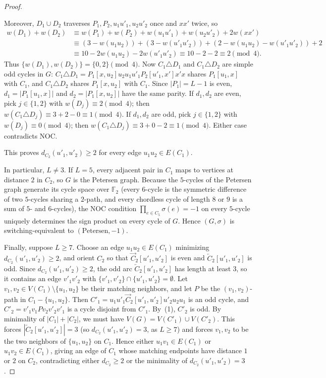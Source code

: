 \documentclass[10pt,letterpaper]{article}
\theoremstyle{zetaplain}
\theoremstyle{zetadef}
\theoremstyle{remark}
\numberwithin{equation}{section}
\newcommand{\vecC}[1]{\overrightarrow{#1}}
\newcommand{\revC}[1]{\overleftarrow{#1}}
\begin{document}
\begin{proof}
\begin{itemize}
  Moreover, $D_1 \cup D_2$ traverses $P_1, P_2, u_1 u'_1, u_2 u'_2$ once and $xx'$ twice, so
  \begin{align*}
    w(D_1) + w(D_2) &\equiv w(P_1) + w(P_2) + w(u_1 u'_1) + w(u_2 u'_2) + 2w(xx') \\
    &\equiv (3 - w(u_1 u_2)) + (3 - w(u'_1 u'_2)) + (2 - w(u_1 u_2) - w(u'_1 u'_2)) + 2 \\
    &\equiv 10 - 2w(u_1 u_2) - 2w(u'_1 u'_2) \equiv 10 - 2 - 2 \equiv 2 \pmod 4.
  \end{align*}
  Thus $\{w(D_1), w(D_2)\} = \{0, 2\} \pmod 4$. Now $C_1 \triangle D_1$ and $C_1 \triangle D_2$ are simple odd cycles in $G$: $C_1 \triangle D_1 = P_1[x, u_2] u_2 u_1 u'_1 P_2[u'_1, x'] x' x$ shares $P_1[u_1, x]$ with $C_1$, and $C_1 \triangle D_2$ shares $P_1[x, u_2]$ with $C_1$. Since $|P_1| = L - 1$ is even, $d_1 = |P_1[u_1, x]|$ and $d_2 = |P_1[x, u_2]|$ have the same parity. If $d_1, d_2$ are even, pick $j \in \{1, 2\}$ with $w(D_j) \equiv 2 \pmod 4$; then $w(C_1 \triangle D_j) \equiv 3 + 2 - 0 \equiv 1 \pmod 4$. If $d_1, d_2$ are odd, pick $j \in \{1, 2\}$ with $w(D_j) \equiv 0 \pmod 4$; then $w(C_1 \triangle D_j) \equiv 3 + 0 - 2 \equiv 1 \pmod 4$. Either case contradicts NOC.
\end{itemize}
This proves $d_{C_2}(u'_1, u'_2) \ge 2$ for every edge $u_1 u_2 \in E(C_1)$.

In particular, $L \ne 3$. If $L = 5$, every adjacent pair in $C_1$ maps to vertices at distance $2$ in $C_2$, so $G$ is the Petersen graph. Because the $5$-cycles of the Petersen graph generate its cycle space over $\mathbb{F}_2$ (every $6$-cycle is the symmetric difference of two $5$-cycles sharing a $2$-path, and every chordless cycle of length $8$ or $9$ is a sum of $5$- and $6$-cycles), the NOC condition $\prod_{e \in C_5} \sigma(e) = -1$ on every $5$-cycle uniquely determines the sign product on every cycle of $G$. Hence $(G, \sigma)$ is switching-equivalent to $(\mathrm{Petersen}, -1)$.

Finally, suppose $L \ge 7$. Choose an edge $u_1 u_2 \in E(C_1)$ minimizing $d_{C_2}(u'_1, u'_2) \ge 2$, and orient $C_2$ so that $\vecC{C}_2[u'_1, u'_2]$ is even and $\revC{C}_2[u'_1, u'_2]$ is odd. Since $d_{C_2}(u'_1, u'_2) \ge 2$, the odd arc $\revC{C}_2[u'_1, u'_2]$ has length at least $3$, so it contains an edge $v'_1 v'_2$ with $\{v'_1, v'_2\} \cap \{u'_1, u'_2\} = \emptyset$. Let $v_1, v_2 \in V(C_1) \setminus \{u_1, u_2\}$ be their matching neighbors, and let $P$ be the $(v_1, v_2)$-path in $C_1 - \{u_1, u_2\}$. Then $C'_1 = u_1 u'_1 \vecC{C}_2[u'_1, u'_2] u'_2 u_2 u_1$ is an odd cycle, and $C'_2 = v'_1 v_1 P v_2 v'_2 v'_1$ is a cycle disjoint from $C'_1$. By~(1), $C'_2$ is odd. By minimality of $|C_1| + |C_2|$, we must have $V(G) = V(C'_1) \cup V(C'_2)$. This forces $|\revC{C}_2[u'_1, u'_2]| = 3$ (so $d_{C_2}(u'_1, u'_2) = 3$, as $L \ge 7$) and forces $v_1, v_2$ to be the two neighbors of $\{u_1, u_2\}$ on $C_1$. Hence either $u_1 v_1 \in E(C_1)$ or $u_1 v_2 \in E(C_1)$, giving an edge of $C_1$ whose matching endpoints have distance $1$ or $2$ on $C_2$, contradicting either $d_{C_2} \ge 2$ or the minimality of $d_{C_2}(u'_1, u'_2) = 3$.
\end{proof}
\end{document}

